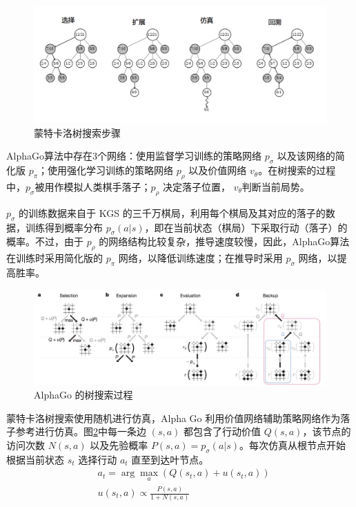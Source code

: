 \begin{figure}[!htbp]
\vspace{1em}
\centering
  \includegraphics[width=1.0\linewidth]{figures/MCTS}
  \caption{蒙特卡洛树搜索步骤}
  \label{fig:MCTS}       %
\vspace{1em}
\end{figure}


AlphaGo算法中存在3个网络：使用监督学习训练的策略网络 $p_\sigma$ 以及该网络的简化版 $p_\pi$；使用强化学习训练的策略网络 $p_\rho$ 以及价值网络 $v_\theta$。在树搜索的过程中，$p_\sigma$被用作模拟人类棋手落子；$p_\rho$ 决定落子位置， $v_\theta$判断当前局势。

$p_\sigma$ 的训练数据来自于 KGS 的三千万棋局，利用每个棋局及其对应的落子的数据，训练得到概率分布 $p_\sigma(a|s)$，即在当前状态（棋局）下采取行动（落子）的概率。不过，由于 $p_\rho$ 的网络结构比较复杂，推导速度较慢，因此，AlphaGo算法在训练时采用简化版的 $p_\pi$ 网络，以降低训练速度；在推导时采用 $p_\sigma$ 网络，以提高胜率。

\begin{figure}[!htbp]
\vspace{1em}
\centering
  \includegraphics[width=1.0\linewidth]{figures/Alpha_GO}
  \caption{AlphaGo 的树搜索过程}
  \label{fig:Alpha_Go}       %
\vspace{1em}
\end{figure}

蒙特卡洛树搜索使用随机进行仿真，Alpha Go 利用价值网络辅助策略网络作为落子参考进行仿真。图\ref{fig:Alpha_Go}中每一条边 $(s,a)$ 都包含了行动价值 $Q(s,a)$，该节点的访问次数 $N(s,a)$ 以及先验概率 $P(s,a) = p_\sigma(a|s)$。每次仿真从根节点开始根据当前状态 $s_t$ 选择行动 $a_t$ 直至到达叶节点。
\begin{equation}
\label{eq:MCTS_selection}
\begin{aligned}
&a_t = \arg \max_a (Q(s_t, a)+u(s_t, a)) \\
&u(s_t, a) \propto \frac{P(s,a)}{1+N(s,a)}
\end{aligned}
\end{equation}

